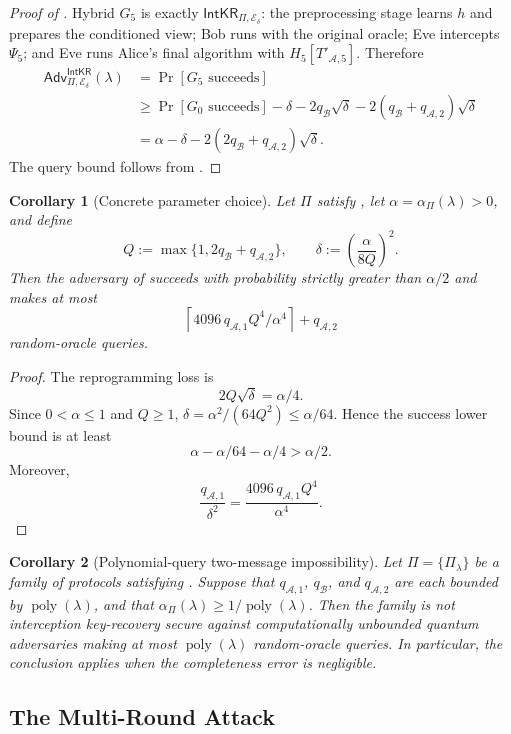\documentclass[11pt]{article}
\newcounter{algorithm}
\newtheorem{corollary}[corollary]{Corollary}
\newcommand{\cA}{\mathcal{A}}
\newcommand{\cB}{\mathcal{B}}
\newcommand{\cE}{\mathcal{E}}
\newcommand{\poly}{\operatorname{poly}}
\newcommand{\IntKR}{\mathsf{IntKR}}
\newcommand{\Adv}{\mathsf{Adv}}
\newcommand{\ceil}[1]{\left\lceil #1\right\rceil}
\begin{document}
\begin{proof}[Proof of ]
Hybrid \(G_5\) is exactly \(\IntKR_{\Pi,\cE_\delta}\): the preprocessing
stage learns \(h\) and prepares the conditioned view; Bob runs with the
original oracle; Eve intercepts \(\Psi_5\); and Eve runs Alice's final
algorithm with \(H_5[T'_{\cA,5}]\).  Therefore
\begin{align*}
  \Adv^{\IntKR}_{\Pi,\cE_\delta}(\lambda)
  &=
  \Pr[G_5\text{ succeeds}]\\
  &\ge
  \Pr[G_0\text{ succeeds}]
  -\delta
  -2q_{\cB}\sqrt\delta
  -2(q_{\cB}+q_{\cA,2})\sqrt\delta\\
  &=
  \alpha-\delta-2(2q_{\cB}+q_{\cA,2})\sqrt\delta.
\end{align*}
The query bound follows from .
\end{proof}

\begin{corollary}[Concrete parameter choice]\label{cor:parameters}
Let \(\Pi\) satisfy , let
\(\alpha=\alpha_\Pi(\lambda)>0\), and define
\[
  Q:=\max\{1,2q_{\cB}+q_{\cA,2}\},
  \qquad
  \delta:=\left(\frac{\alpha}{8Q}\right)^2.
\]
Then the adversary of  succeeds with probability strictly
greater than \(\alpha/2\) and makes at most
\[
  \ceil{4096\,q_{\cA,1}Q^4/\alpha^4}+q_{\cA,2}
\]
random-oracle queries.
\end{corollary}

\begin{proof}
The reprogramming loss is
\[
  2Q\sqrt\delta=\alpha/4.
\]
Since \(0<\alpha\le1\) and \(Q\ge1\),
\(\delta=\alpha^2/(64Q^2)\le\alpha/64\).  Hence the success lower bound is
at least
\[
  \alpha-\alpha/64-\alpha/4>\alpha/2.
\]
Moreover,
\[
  \frac{q_{\cA,1}}{\delta^2}
  =
  \frac{4096\,q_{\cA,1}Q^4}{\alpha^4}.
\]
\end{proof}

\begin{corollary}[Polynomial-query two-message impossibility]\label{cor:quantum-impossibility}
Let \(\Pi=\{\Pi_\lambda\}\) be a family of protocols satisfying
. Suppose that \(q_{\cA,1}\), \(q_{\cB}\), and
\(q_{\cA,2}\) are each bounded by \(\poly(\lambda)\), and that
\(\alpha_\Pi(\lambda)\ge1/\poly(\lambda)\). Then the family is not
interception key-recovery secure against computationally unbounded quantum
adversaries making at most \(\poly(\lambda)\) random-oracle queries. In
particular, the conclusion applies when the completeness error is negligible.
\end{corollary}

\subsection{The Multi-Round Attack}
\label{sec:multi-round}
\end{document}
